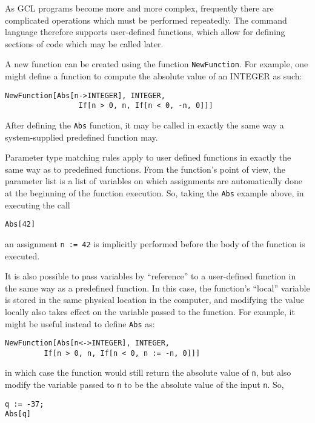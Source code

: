 As GCL programs become more and more complex, frequently there are complicated
operations which must be performed repeatedly.  The command language therefore
supports user-defined functions, which allow for defining sections of code
which may be called later.

A new function can be created using the function
\verb+NewFunction+.  For example, one might define a function to compute
the absolute value of an INTEGER as such:

\begin{verbatim}
NewFunction[Abs[n->INTEGER], INTEGER,
                 If[n > 0, n, If[n < 0, -n, 0]]]
\end{verbatim}

\noindent After defining the \verb+Abs+ function, it may be called in exactly
the same way a system-supplied predefined function may.

Parameter type matching rules apply to user defined functions in exactly the
same way as to predefined functions.  From the function's point of view,
the parameter list is a list of variables on which assignments are
automatically done at the beginning of the function execution.  So, taking
the \verb+Abs+ example above, in executing the call

\begin{verbatim}
Abs[42]
\end{verbatim}

\noindent an assignment \verb+n := 42+ is implicitly performed before the
body of the function is executed.

It is also possible to pass variables by ``reference'' to a user-defined
function in the same way as a predefined function.  In this case, the
function's ``local'' variable is stored in the same physical location in the
computer, and modifying the value locally also takes effect on the variable
passed to the function.  For example, it might
be useful instead to define \verb+Abs+ as:

\begin{verbatim}
NewFunction[Abs[n<->INTEGER], INTEGER,
		 If[n > 0, n, If[n < 0, n := -n, 0]]]
\end{verbatim}

\noindent in which case the function would still return the absolute value
of \verb+n+, but also modify the variable passed to \verb+n+ to be the
absolute value of the input \verb+n+.  So,

\begin{verbatim}
q := -37;
Abs[q]
\end{verbatim}

